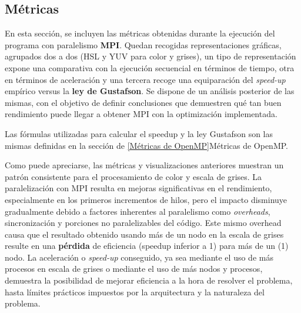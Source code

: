 \subsection{Métricas}
En esta sección, se incluyen las métricas obtenidas durante la ejecución del programa con paralelismo \textbf{MPI}. Quedan recogidas representaciones gráficas, agrupados dos a dos (HSL y YUV para color y grises), un tipo de representación expone una comparativa con la ejecución secuencial en términos de tiempo, otra en términos de aceleración y una tercera recoge una equiparación del \textit{speed-up} empírico versus la \textbf{ley de Gustafson}. 
Se dispone de un análisis posterior de las mismas, con el objetivo de definir conclusiones que demuestren qué tan buen rendimiento puede llegar a obtener MPI con la optimización implementada.

Las fórmulas utilizadas para calcular el speedup y la ley Gustafson son las mismas definidas en la sección de \ref{Métricas de OpenMP}{Métricas de OpenMP}.



\newpage
{}

Como puede apreciarse, las métricas y visualizaciones anteriores muestran un patrón consistente para el procesamiento de color y escala de grises. 
La paralelización con MPI resulta en mejoras significativas en el rendimiento, especialmente en los primeros incrementos de hilos, pero el impacto disminuye gradualmente debido a factores inherentes al paralelismo como \textit{overheads}, sincronización y porciones no paralelizables del código. 
Este mismo overhead causa que el resultado obtenido usando más de un nodo en la escala de grises resulte en una \textbf{pérdida} de eficiencia (speedup inferior a 1) para más de un (1) nodo.
La aceleración o \textit{speed-up} conseguido, ya sea mediante el uso de más procesos en escala de grises o mediante el uso de más nodos y procesos, demuestra la posibilidad de mejorar eficiencia a la hora de resolver el problema, hasta límites prácticos impuestos por la arquitectura y la naturaleza del problema.

